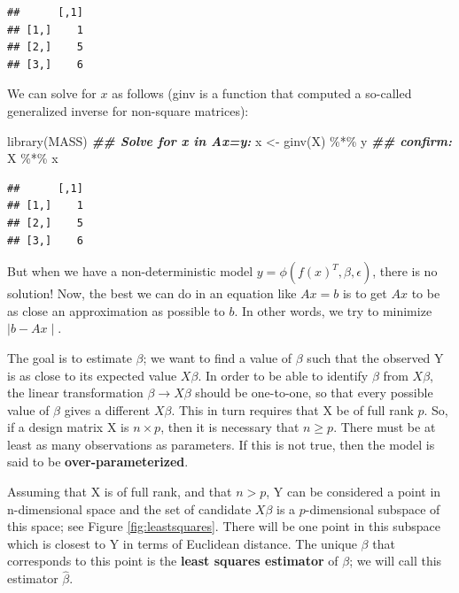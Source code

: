 \documentclass[
  12pt,
]{krantz}
\newenvironment{Shaded}{\begin{snugshade}}{\end{snugshade}}
\newcommand{\DocumentationTok}[1]{\textcolor[rgb]{0.56,0.35,0.01}{\textbf{\textit{#1}}}}
\newcommand{\FunctionTok}[1]{\textcolor[rgb]{0.00,0.00,0.00}{#1}}
\newcommand{\NormalTok}[1]{#1}
\newcommand{\OtherTok}[1]{\textcolor[rgb]{0.56,0.35,0.01}{#1}}
\newcommand{\SpecialCharTok}[1]{\textcolor[rgb]{0.00,0.00,0.00}{#1}}
\theoremstyle{definition}
\theoremstyle{definition}
\theoremstyle{definition}
\theoremstyle{definition}
\theoremstyle{remark}
\begin{document}
\begin{verbatim}
##      [,1]
## [1,]    1
## [2,]    5
## [3,]    6
\end{verbatim}

We can solve for \(x\) as follows (ginv is a function that computed a so-called generalized inverse for non-square matrices):

\begin{Shaded}
\begin{Highlighting}[]
\FunctionTok{library}\NormalTok{(MASS)}
\DocumentationTok{\#\# Solve for x in Ax=y:}
\NormalTok{x }\OtherTok{\textless{}{-}} \FunctionTok{ginv}\NormalTok{(X) }\SpecialCharTok{\%*\%}\NormalTok{ y}
\DocumentationTok{\#\# confirm:}
\NormalTok{X }\SpecialCharTok{\%*\%}\NormalTok{ x}
\end{Highlighting}
\end{Shaded}

\begin{verbatim}
##      [,1]
## [1,]    1
## [2,]    5
## [3,]    6
\end{verbatim}

But when we have a non-deterministic model
\(y=\phi(f(x)^T,\beta,\epsilon)\), there is no solution! Now, the best we can do in an equation like \(Ax=b\) is to get \(Ax\) to be as close an approximation as possible to \(b\). In other words, we try to minimize \(\mid b-Ax\mid\).

The goal is to estimate \(\beta\); we want to find a value of \(\beta\) such that the observed Y is as close to its expected value \(X\beta\).
In order to be able to identify \(\beta\) from \(X\beta\), the linear transformation \(\beta \rightarrow X\beta\) should be one-to-one, so that every possible value of \(\beta\) gives a different \(X\beta\). This in turn requires that X be of full rank \(p\). So, if a design matrix X is \(n\times p\), then it is necessary that \(n\geq p\). There must be at least as many observations as parameters. If this is not true, then the model is said to be \textbf{over-parameterized}.

Assuming that X is of full rank, and that \(n>p\),
Y can be considered a point in n-dimensional space and the set of candidate \(X\beta\) is a \(p\)-dimensional subspace of this space; see Figure \ref{fig:leastsquares}. There will be one point in this subspace which is closest to Y in terms of Euclidean distance. The unique \(\beta\) that corresponds to this point is the \textbf{least squares estimator} of \(\beta\); we will call this estimator \(\hat \beta\).
\end{document}
